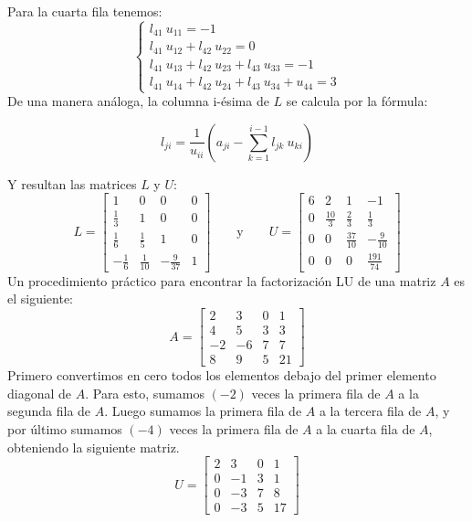 Para la cuarta fila tenemos:
\[
\begin{cases}
  l_{41}~u_{11} = -1 \\
  l_{41}~u_{12} + l_{42}~u_{22} = 0 \\
  l_{41}~u_{13} + l_{42}~u_{23} + l_{43}~u_{33} = -1 \\
  l_{41}~u_{14} + l_{42}~u_{24} + l_{43}~u_{34} + u_{44} = 3
\end{cases}
\]
De una manera análoga, la columna i-ésima de \(L\) se calcula por la fórmula:
\begin{tcolorbox}[myconclusion]
  \[l_{ji} = \frac{1}{u_{ii}}\left(a_{ji}-\sum_{k=1}^{i-1}l_{jk}~u_{ki}\right)\]
\end{tcolorbox}
Y resultan las matrices \(L\) y \(U\):
\[
L = \begin{bmatrix}
  1 & 0 & 0 & 0 \\
  \frac{1}{3} & 1 & 0 & 0 \\
  \frac{1}{6} & \frac{1}{5} & 1 & 0 \\
  -\frac{1}{6} & \frac{1}{10} & -\frac{9}{37} & 1
\end{bmatrix} \qquad \text{y} \qquad U = \begin{bmatrix}
  6 & 2 & 1 & -1 \\
  0 & \frac{10}{3} & \frac{2}{3} & \frac{1}{3} \\
  0 & 0 & \frac{37}{10} & -\frac{9}{10} \\
  0 & 0 & 0 & \frac{191}{74}
\end{bmatrix}
\]
Un procedimiento práctico para encontrar la factorización LU de una matriz \(A\) es el siguiente:
\[
  A = \begin{bmatrix}
    2 & 3 & 0 & 1 \\
    4 & 5 & 3 & 3 \\
    -2 & -6 & 7 & 7 \\
    8 & 9 & 5 & 21
  \end{bmatrix}
\]
Primero convertimos en cero todos los elementos debajo del primer elemento diagonal de \(A\). Para esto, sumamos \((-2)\) veces la primera fila de \(A\) a la segunda fila de \(A\). Luego sumamos la primera fila de \(A\) a la tercera fila de \(A\), y por último sumamos \((-4)\) veces la primera fila de \(A\) a la cuarta fila de \(A\), obteniendo la siguiente matriz.
\[ U=
\begin{bmatrix}
  2 & 3 & 0 & 1 \\
  0 & -1 & 3 & 1 \\
  0 & -3 & 7 & 8 \\
  0 & -3 & 5 & 17
\end{bmatrix}
\]
